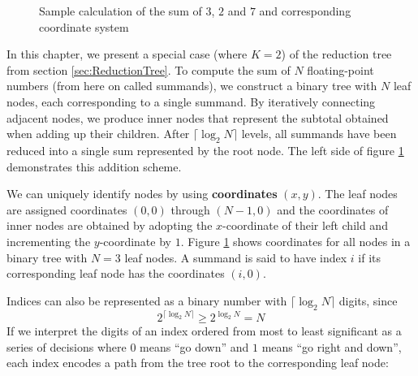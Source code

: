 \newcommand{\numLevels}{\lceil \log_2 N \rceil}
\newcommand{\ffs}{\textrm{ffs}}

\begin{figure}[H]
\centering
{}
\caption{Sample calculation of the sum of $3$, $2$ and $7$ and corresponding coordinate system}
\label{fig:coordinateExample}
\end{figure}

In this chapter, we present a special case (where $K = 2$) of the reduction tree from section \ref{sec:ReductionTree}.
To compute the sum of $N$ floating-point numbers (from here on called summands), we construct a binary tree with $N$ leaf nodes,
each corresponding to a single summand.
By iteratively connecting adjacent nodes, we produce inner nodes that represent the subtotal obtained when adding up their children.
After $\numLevels$ levels, all summands have been reduced into a single sum represented by the root node.
The left side of figure \ref{fig:coordinateExample} demonstrates this addition scheme.

We can uniquely identify nodes by using \textbf{coordinates} $(x, y)$. The leaf nodes are assigned coordinates
$(0,0)$ through $(N-1,0)$ and the coordinates of inner nodes are obtained by adopting the $x$-coordinate of their left child and incrementing
the $y$-coordinate by $1$. Figure \ref{fig:coordinateExample} shows coordinates for all nodes in a binary tree with $N = 3$ leaf nodes.
A summand is said to have index $i$ if its corresponding leaf node has the coordinates $(i,0)$.

Indices can also be represented as a binary number with $\numLevels$ digits, since
\begin{equation}
2^{\numLevels} \geq 2^{\log_2 N} = N
\end{equation}
If we interpret the digits of an index ordered from most to least significant as a series of decisions where $0$ means \enquote{go down}
and $1$ means \enquote{go right and down}, each index encodes a path from the tree root to the corresponding leaf node:

